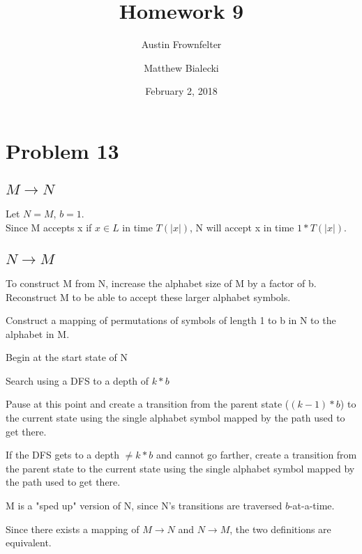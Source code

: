 \documentclass{article}
\title{Homework 9}
\author{Austin Frownfelter \and Matthew Bialecki}
\date{February 2, 2018}
\begin{document}
\maketitle

\section{Problem 13}
\subsection{$M\rightarrow N$}
Let $N=M$, $b=1$.
\\Since M accepts x if $x\in L$ in time $T(|x|)$, N will accept x in time $1*T(|x|)$.

\subsection{$N\rightarrow M$}
To construct M from N, increase the alphabet size of M by a factor of b.  Reconstruct M to be able to accept these larger alphabet symbols.

Construct a mapping of permutations of symbols of length 1 to b in N to the alphabet in M.

Begin at the start state of N

Search using a DFS to a depth of $k*b$

Pause at this point and create a transition from the parent state ($(k-1)*b$) to the current state using the single alphabet symbol mapped by the path used to get there.

If the DFS gets to a depth $\neq k*b$ and cannot go farther, create a transition from the parent state to the current state using the single alphabet symbol mapped by the path used to get there.

M is a "sped up" version of N, since N's transitions are traversed $b$-at-a-time.

Since there exists a mapping of $M\rightarrow N$ and $N\rightarrow M$, the two definitions are equivalent.
\end{document}
